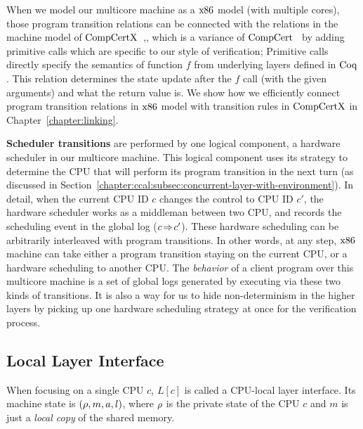When we model our multicore machine as a $\mathrm{x86}$ model (with multiple cores),
those program transition relations can be connected with the relations 
in the machine model of $\mathrm{CompCertX}$~\cite{deepspec},, 
which is a variance of $\mathrm{CompCert}$~\cite{leroy09}
by adding primitive calls which are specific to our style of verification;
Primitive calls directly specify the semantics of function $f$ from underlying layers defined in $\mathrm{Coq}$. 
This relation determines the state update after the $f$ call (with the given arguments) and what the return value is.
We show how we efficiently connect program transition relations in 
$\mathrm{x86}$ model with transition rules in $\mathrm{CompCertX}$ in Chapter~\ref{chapter:linking}.

\textbf{Scheduler transitions} are performed by one logical component, a hardware scheduler in our multicore machine.
This logical component uses its strategy 
to determine  the CPU that will perform its program transition 
in the next turn (as discussed in Section~\ref{chapter:ccal:subsec:concurrent-layer-with-environment}).
In detail, when the current CPU ID $c$ changes
the control to CPU ID $c'$,
the hardware scheduler works as a
middleman between 
two CPU, and records the scheduling event 
in the global log ($c \!\Rightarrow\! c'$).
These hardware scheduling
can be arbitrarily interleaved with
program transitions.
In other words, at any step,
$\mathrm{x86}$ machine can take either a program transition staying
on the current CPU,
or a hardware scheduling to another CPU.
The \emph{behavior} of a client program  over this multicore machine is a set of global logs generated by executing  via these two kinds of transitions.
It is also a way for us to hide non-determinism in the higher layers
by picking up 
one hardware scheduling strategy at once for the verification process.




\subsection{Local Layer Interface}
\label{chapter:ccal:subsec:local-layer-interface}

When focusing on a single CPU $c$, $L[c]$ is called 
a CPU-local layer interface.
Its machine state is $(\rho, m, a, l)$,
where $\rho$ is the private state of the CPU $c$
and $m$ is just a \emph{local copy} of the shared memory.

